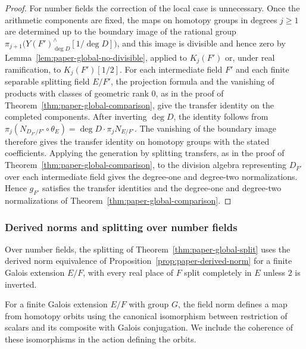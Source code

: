 \begin{proof}
For number fields the correction of the local case is unnecessary.
Once the arithmetic components are fixed, the maps on homotopy groups in degrees $j\ge1$ are determined up to the boundary image of the rational group $\pi_{j+1}\bigl(Y(F')^\wedge_{\deg D}[1/\deg D]\bigr)$, and this image is divisible and hence zero by Lemma~\ref{lem:paper-global-no-divisible}, applied to $K_j(F')$ or, under real ramification, to $K_j(F')[1/2]$.
For each intermediate field $F'$ and each finite separable splitting field $E/F'$, the projection formula and the vanishing of products with classes of geometric rank $0$, as in the proof of Theorem~\ref{thm:paper-global-comparison}, give the transfer identity on the completed components.
After inverting $\deg D$, the identity follows from $\pi_j(N_{D_{F'}/F'}\circ\theta_E)=\deg D\cdot\pi_jN_{E/F'}$.
The vanishing of the boundary image therefore gives the transfer identity on homotopy groups with the stated coefficients.
Applying the generation by splitting transfers, as in the proof of Theorem~\ref{thm:paper-global-comparison}, to the division algebra representing $D_{F'}$ over each intermediate field gives the degree-one and degree-two normalizations.
Hence $g_{F'}$ satisfies the transfer identities and the degree-one and degree-two normalizations of Theorem~\ref{thm:paper-global-comparison}.
\end{proof}

\subsubsection{Derived norms and splitting over number fields}
Over number fields, the splitting of Theorem~\ref{thm:paper-global-split} uses the derived norm equivalence of Proposition~\ref{prop:paper-derived-norm} for a finite Galois extension $E/F$, with every real place of $F$ split completely in $E$ unless $2$ is inverted.

For a finite Galois extension $E/F$ with group $G$, the field norm defines a map from homotopy orbits using the canonical isomorphism between restriction of scalars and its composite with Galois conjugation.
We include the coherence of these isomorphisms in the action defining the orbits.

